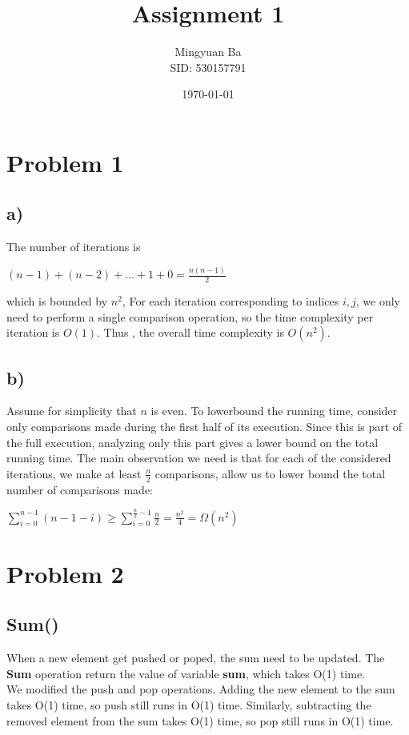 \documentclass[12pt]{article}
\title{Assignment 1}
\author{Mingyuan Ba \\ SID: 530157791}
\date{\today}
\begin{document}
\maketitle

\section*{Problem 1}
\subsection*{a)}
The number of iterations is 
\begin{center}
    $(n-1) + (n-2) + \dots + 1 + 0= \frac{n(n-1)}{2}$
\end{center}
which is bounded by $n^2$, For each iteration corresponding to 
indices $i,j$, we only need to perform a single comparison operation, 
so the time complexity per iteration is $O(1)$.
Thus , the overall time complexity is $O(n^2)$.

\subsection*{b)}
Assume for simplicity that $n$ is even. To lowerbound the running time, 
consider only comparisons made during the first half of its execution.
Since this is part of the full execution, analyzing only this part 
gives a lower bound on the total running time.  The main observation we 
need is that for each of the considered iterations, we make at least 
$\frac{n}{2}$ comparisons, allow us to lower bound the total number 
of comparisons made:
\begin{center}
    $\sum_{i=0}^{n-1} (n-1- i) \geq \sum_{i=0}^{\frac{n}{2} - 1} \frac{n}{2}
    = \frac{n^2}{4} = \Omega{(n^2)}$
\end{center}

\newpage

\section*{Problem 2}

\subsection*{Sum()}

When a new element get pushed or poped, the sum need to be updated.
The \textbf{Sum} operation return the value of variable \textbf{sum},
which takes O(1) time.\\
We modified the push and pop operations. 
Adding the new element to the sum takes O(1) time, so push still runs 
in O(1) time. Similarly, subtracting the removed element from the 
sum takes O(1) time, so pop still runs in O(1) time.
\end{document}
